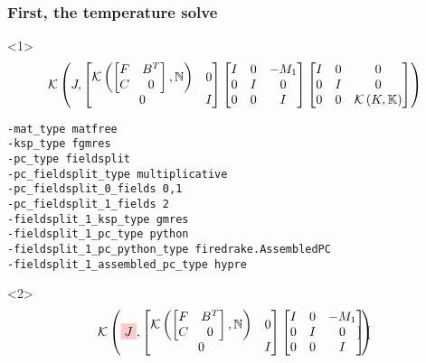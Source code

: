 \documentclass[presentation]{beamer}
\newcommand{\KSP}[2]{\ensuremath{\mathcal{K}\left(#1, \mathbb{#2}\right)}}
\newcommand{\ksp}[1]{\KSP{#1}{#1}}
\newcommand{\highlight}[1]{\colorbox{red!20}{\color{black} #1}}
\begin{document}
\begin{frame}[fragile]
  \frametitle{First, the temperature solve}
  \small
  \begin{onlyenv}<1>
    \begin{equation*}
      \KSP{J}{%
      \begin{bmatrix}
        \KSP{\begin{bmatrix}
            F & B^T\\
            C & 0
          \end{bmatrix}}{N} & 0\\
        0 & I
      \end{bmatrix}
      \begin{bmatrix}
        I & 0 & -M_1\\
        0 & I & 0 \\
        0 & 0 & I
      \end{bmatrix}
      \begin{bmatrix}
        I & 0 & 0\\
        0 & I & 0\\
        0 & 0 &\ksp{K}
      \end{bmatrix}}
    \end{equation*}
\begin{verbatim}
-mat_type matfree
-ksp_type fgmres
-pc_type fieldsplit
-pc_fieldsplit_type multiplicative
-pc_fieldsplit_0_fields 0,1
-pc_fieldsplit_1_fields 2
-fieldsplit_1_ksp_type gmres
-fieldsplit_1_pc_type python
-fieldsplit_1_pc_python_type firedrake.AssembledPC
-fieldsplit_1_assembled_pc_type hypre
\end{verbatim}
  \end{onlyenv}
  \begin{onlyenv}<2>
    \color{gray}
    \begin{equation*}
      \KSP{\highlight{$J$}}{%
      \begin{bmatrix}
        \KSP{\begin{bmatrix}
            F & B^T\\
            C & 0
          \end{bmatrix}}{N} & 0\\
        0 & I
      \end{bmatrix}
      \begin{bmatrix}
        I & 0 & -M_1\\
        0 & I & 0 \\
        0 & 0 & I
      \end{bmatrix}
      \begin{bmatrix}

\end{bmatrix}}
\end{equation*}
\end{onlyenv}
\end{frame}
\end{document}
